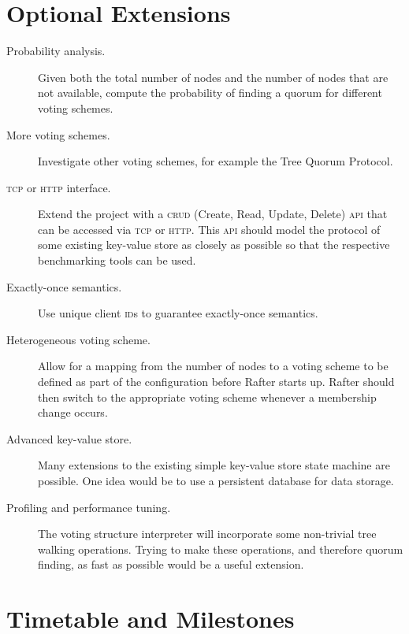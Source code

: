 \documentclass[12pt,chapterprefix=true,toc=bibliography,numbers=noendperiod,
               footnotes=multiple,twoside]{scrreprt}
\begin{document}
\section*{Optional Extensions%
  \label{optional-extensions}%
}
%
\begin{description}

\item[Probability analysis.] Given both the total number of nodes and the number of nodes that are not available, compute the probability of finding a quorum for different voting schemes.

\item[More voting schemes.] Investigate other voting schemes, for example the Tree Quorum Protocol.

\item[\textsc{tcp} or \textsc{http} interface.] Extend the project with a \textsc{crud} (Create, Read, Update, Delete) \textsc{api} that can be accessed via \textsc{tcp} or \textsc{http}. This \textsc{api} should model the protocol of some existing key-value store as closely as possible so that the respective benchmarking tools can be used.

\item[Exactly-once semantics.] Use unique client \textsc{id}s to guarantee exactly-once semantics.

\item[Heterogeneous voting scheme.] Allow for a mapping from the number of nodes to a voting scheme to be defined as part of the configuration before Rafter starts up. Rafter should then switch to the appropriate voting scheme whenever a membership change occurs.

\item[Advanced key-value store.] Many extensions to the existing simple key-value store state machine are possible. One idea would be to use a persistent database for data storage.

\item[Profiling and performance tuning.] The voting structure interpreter will incorporate some non-trivial tree walking operations. Trying to make these operations, and therefore quorum finding, as fast as possible would be a useful extension.

\end{description}


\section*{Timetable and Milestones%
  \label{timetable-and-milestones}%
}
\end{document}
